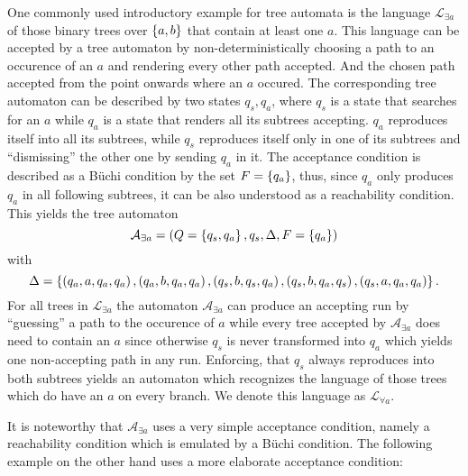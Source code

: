 \begin{example}
  One commonly used introductory example for tree automata is the language
  $\mathcal{L}_{\exists a}$ of those binary trees over $\left\{a,b\right\}$ that contain
  at least one $a$. This language can be accepted by a tree automaton by
  non-deterministically choosing a path to an occurence of an $a$ and rendering
  every other path accepted. And the chosen path accepted from the point
  onwards where an $a$ occured. The corresponding tree automaton can be
  described by two states $q_{s}, q_{a}$, where $q_{s}$ is a state that
  searches for an $a$ while $q_{a}$ is a state that renders all its subtrees
  accepting. $q_{a}$ reproduces itself into all its subtrees, while $q_{s}$
  reproduces itself only in one of its subtrees and \enquote{dismissing} the
  other one by sending $q_{a}$ in it. The acceptance condition is described as
  a Büchi condition by the set $F = \left\{q_{a}\right\}$, thus, since $q_{a}$ only
  produces $q_{a}$ in all following subtrees, it can be also understood as a
  reachability condition. This yields the tree automaton
  \begin{equation*}
    \mathcal{A}_{\exists a} = \left(Q = \left\{q_{s}, q_{a}\right\}, q_{s},
    \Delta
    ,F = \left\{q_{a}\right\}\right)
  \end{equation*}
  with
  \begin{equation*}
    \Delta = \left\{\left(q_{a}, a, q_{a}, q_{a}\right),\left(q_{a}, b, q_{a}, q_{a}\right),
      \left(q_{s}, b, q_{s}, q_{a}\right), \left(q_{s}, b, q_{a}, q_{s}\right),
      \left(q_{s}, a, q_{a}, q_{a}\right)\right\}.
  \end{equation*}
  For all trees in $\mathcal{L}_{\exists a}$ the automaton
  $\mathcal{A}_{\exists a}$ can produce an accepting run by \enquote{guessing}
  a path to the occurence of $a$ while every tree accepted by
  $\mathcal{A}_{\exists a}$ does need to contain an $a$ since otherwise $q_{s}$
  is never transformed into $q_{a}$ which yields one non-accepting path in any
  run. Enforcing, that $q_{s}$ always reproduces into both subtrees yields an
  automaton which recognizes the language of those trees which do have an $a$
  on every branch. We denote this language as $\mathcal{L}_{\forall a}$.
  \label{ex:treeexa}
\end{example}
It is noteworthy that $\mathcal{A}_{\exists a}$ uses a very simple acceptance
condition, namely a reachability condition which is emulated by a Büchi
condition. The following example on the other hand uses a more elaborate
acceptance condition:
